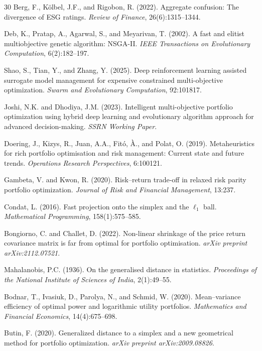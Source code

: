 \documentclass[10pt,twocolumn,a4paper]{article}
\begin{document}
\begin{thebibliography}{30}
Berg, F., K\"olbel, J.F., and Rigobon, R. (2022).
Aggregate confusion: The divergence of ESG ratings.
\emph{Review of Finance}, 26(6):1315--1344.

Deb, K., Pratap, A., Agarwal, S., and Meyarivan, T. (2002).
A fast and elitist multiobjective genetic algorithm: NSGA-II.
\emph{IEEE Transactions on Evolutionary Computation}, 6(2):182--197.

Shao, S., Tian, Y., and Zhang, Y. (2025).
Deep reinforcement learning assisted surrogate model management for expensive constrained multi-objective optimization.
\emph{Swarm and Evolutionary Computation}, 92:101817.

Joshi, N.K. and Dhodiya, J.M. (2023).
Intelligent multi-objective portfolio optimization using hybrid deep learning and evolutionary algorithm approach for advanced decision-making.
\emph{SSRN Working Paper}.

Doering, J., Kizys, R., Juan, A.A., Fit\'o, \`A., and Polat, O. (2019).
Metaheuristics for rich portfolio optimisation and risk management: Current state and future trends.
\emph{Operations Research Perspectives}, 6:100121.

Gambeta, V. and Kwon, R. (2020).
Risk--return trade-off in relaxed risk parity portfolio optimization.
\emph{Journal of Risk and Financial Management}, 13:237.

Condat, L. (2016).
Fast projection onto the simplex and the $\ell_1$ ball.
\emph{Mathematical Programming}, 158(1):575--585.

Bongiorno, C. and Challet, D. (2022).
Non-linear shrinkage of the price return covariance matrix is far from optimal for portfolio optimisation.
\emph{arXiv preprint arXiv:2112.07521}.

Mahalanobis, P.C. (1936).
On the generalised distance in statistics.
\emph{Proceedings of the National Institute of Sciences of India}, 2(1):49--55.

Bodnar, T., Ivasiuk, D., Parolya, N., and Schmid, W. (2020).
Mean--variance efficiency of optimal power and logarithmic utility portfolios.
\emph{Mathematics and Financial Economics}, 14(4):675--698.

Butin, F. (2020).
Generalized distance to a simplex and a new geometrical method for portfolio optimization.
\emph{arXiv preprint arXiv:2009.08826}.

\end{thebibliography}
\end{document}
